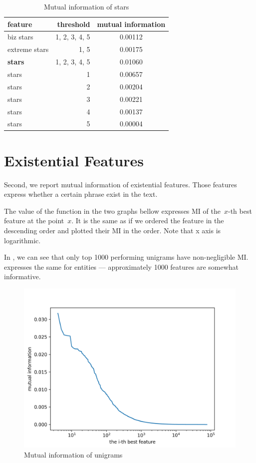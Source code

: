 \begin{table}[h!]
\centering
\begin{tabular}{lrS[table-format=3.2]}
\toprule
\textbf{feature} & \textbf{threshold} & \textbf{mutual information} \\
\midrule
biz stars & 1, 2, 3, 4, 5 & 0.00112 \\
extreme stars & 1, 5 & 0.00175 \\
\textbf{stars} & 1, 2, 3, 4, 5& 0.01060 \\
stars & 1 & 0.00657 \\
stars & 2 & 0.00204 \\
stars & 3 & 0.00221 \\
stars & 4 & 0.00137 \\
stars & 5 & 0.00004 \\
\bottomrule
\end{tabular}

\caption{Mutual information of stars}\label{tab:mi_stars}
\end{table}


\section{Existential Features}

Second, we report mutual information of existential features.
Those features express whether a certain phrase exist in the text.

The value of the function in the two graphs bellow expresses
MI of the~$x$-th best feature at the point~$x$.
It is the same as if we ordered the feature in the descending order
and plotted their MI in the order.
Note that x axis is logarithmic.

In ,
we can see that only top 1000 performing unigrams have non-negligible MI.
 expresses the same for entities
--- approximately 1000 features are somewhat informative.


\begin{figure}[ht]\centering
\includegraphics[width=130mm]{figures/unigrams.png}
\caption{Mutual information of unigrams}
\label{fig:mi_unigrams}
\end{figure}



